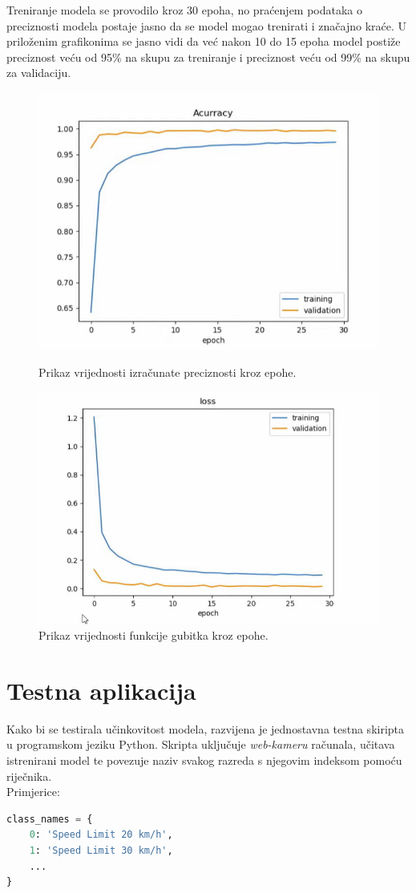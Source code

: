 \documentclass[times, utf8, zavrsni]{fer}
\begin{document}
Treniranje modela se provodilo kroz 30 epoha, no praćenjem podataka o preciznosti modela postaje jasno da se model mogao trenirati i značajno kraće.
U priloženim grafikonima se jasno vidi da već nakon 10 do 15 epoha model postiže preciznost veću od 95\% na skupu za treniranje i preciznost veću od 99\% na skupu za validaciju.
\begin{figure}[h!]
  \includegraphics[width=\linewidth,trim=4 4 4 4,clip]{images/acc_plot.jpeg}
  \caption{Prikaz vrijednosti izračunate preciznosti kroz epohe.}
  \includegraphics[width=\linewidth,trim=4 4 4 4,clip]{images/loss_plot.jpeg}
  \caption{Prikaz vrijednosti funkcije gubitka kroz epohe.}
\end{figure} 

\pagebreak
\section{Testna aplikacija}
Kako bi se testirala učinkovitost modela, razvijena je jednostavna testna skiripta u programskom jeziku Python. Skripta uključuje  \emph{web-kameru} računala, učitava istrenirani model te povezuje naziv svakog razreda s njegovim indeksom pomoću riječnika.
\\Primjerice:
\begin{lstlisting}[language=Python]
class_names = {
    0: 'Speed Limit 20 km/h',
    1: 'Speed Limit 30 km/h',
    ...
}
\end{lstlisting}
\end{document}
